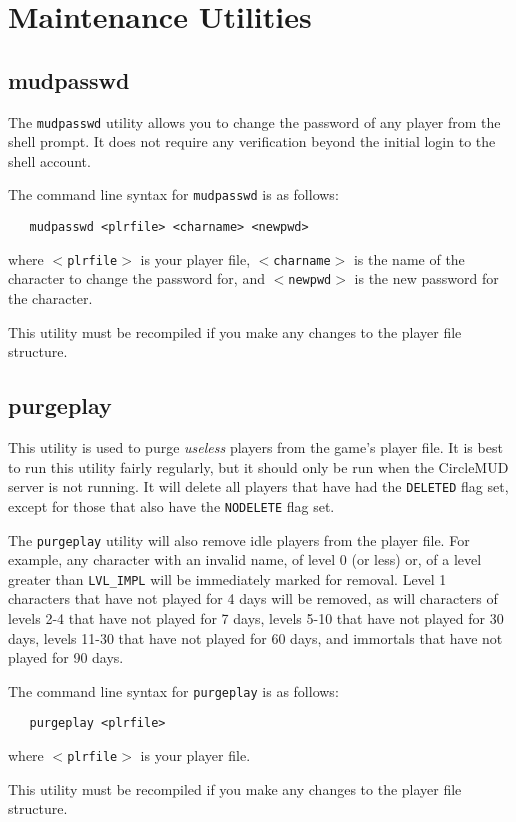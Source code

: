 \documentclass[11pt]{article}
\begin{document}
\section{Maintenance Utilities}
\subsection{mudpasswd}
The \texttt{mudpasswd} utility allows you to change the password of any player from the shell prompt.  It does not require any verification beyond the initial login to the shell account.
\par
The command line syntax for \texttt{mudpasswd} is as follows:
\begin{verbatim}
   mudpasswd <plrfile> <charname> <newpwd>
\end{verbatim}
where \texttt{$<$plrfile$>$} is your player file, \texttt{$<$charname$>$} is the name of the character to change the password for, and \texttt{$<$newpwd$>$} is the new password for the character.
\par
This utility must be recompiled if you make any changes to the player file structure.

\subsection{purgeplay}
This utility is used to purge {\em useless} players from the game's player file.  It is best to run this utility fairly regularly, but it should only be run when the CircleMUD server is not running.  It will delete all players that have had the \texttt{DELETED} flag set, except for those that also have the \texttt{NODELETE} flag set.
\par
The \texttt{purgeplay} utility will also remove idle players from the player file.  For example, any character with an invalid name, of level 0 (or less) or, of a level greater than \texttt{LVL\_IMPL} will be immediately marked for removal.  Level 1 characters that have not played for 4 days will be removed, as will characters of levels 2-4 that have not played for 7 days, levels 5-10 that have not played for 30 days, levels 11-30 that have not played for 60 days, and immortals that have not played for 90 days.
\par
The command line syntax for \texttt{purgeplay} is as follows:
\begin{verbatim}
   purgeplay <plrfile>
\end{verbatim}
where \texttt{$<$plrfile$>$} is your player file.
\par
This utility must be recompiled if you make any changes to the player file structure.
\end{document}
